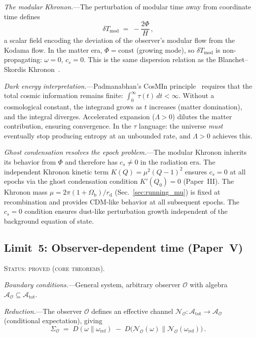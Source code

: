 \documentclass[prd,twocolumn,superscriptaddress,longbibliography,floatfix]{revtex4-2}
\newcommand{\chan}{\mathcal{N}}
\newcommand{\KL}{D}
\newcommand{\tauasym}{\tau}
\newcommand{\Aobs}{\mathcal{A}_{\mathcal{O}}}
\newcommand{\Atot}{\mathcal{A}_{\mathrm{tot}}}
\newcommand{\SigO}{\Sigma_{\mathcal{O}}}
\newcommand{\Tmod}{T_{\mathrm{mod}}}
\begin{document}
\emph{The modular Khronon.}---The perturbation of
modular time away from coordinate time defines
\begin{equation}
\delta\Tmod \;=\; -\frac{2\Phi}{H}\,,
\label{eq:modular_khronon}
\end{equation}
a scalar field encoding the deviation of the observer's
modular flow from the Kodama flow.  In the matter era,
$\Phi = \mathrm{const}$ (growing mode), so $\delta\Tmod$
is non-propagating: $\omega = 0$, $c_s = 0$.
This is the same dispersion relation as the
Blanchet--Skordis Khronon~\cite{BlanchetSkordis2024}.

\emph{Dark energy interpretation.}---Padmanabhan's CosMIn
principle~\cite{Padmanabhan2017} requires that the
total cosmic information remains finite:
$\int_0^\infty \tauasym(t)\,dt < \infty$.  Without a
cosmological constant, the integrand grows as $t$
increases (matter domination), and the integral diverges.
Accelerated expansion ($\Lambda > 0$) dilutes the matter
contribution, ensuring convergence.  In the
$\tauasym$ language: the universe \emph{must} eventually
stop producing entropy at an unbounded rate, and
$\Lambda > 0$ achieves this.

\emph{Ghost condensation resolves the epoch
problem.}---The modular Khronon inherits its behavior
from $\Phi$ and therefore has $c_s \neq 0$ in the
radiation era.  The independent Khronon kinetic term
$K(Q) = \mu^2(Q-1)^2$ ensures $c_s = 0$ at all epochs
via the ghost condensation condition $K'(Q_0) = 0$
(Paper~III).
The Khronon mass
$\mu = 2\pi(1+\Omega_{\mathrm{b}})/r_{\mathrm{d}}$
(Sec.~\ref{sec:running_mu}) is fixed at recombination
and provides CDM-like behavior at all subsequent
epochs.  The $c_s = 0$ condition ensures dust-like
perturbation growth independent of the background
equation of state.


\subsection{Limit~5: Observer-dependent time (Paper~V)}
\label{sec:limit_observer}

\textsc{Status: proved (core theorems).}

\emph{Boundary conditions.}---General system, arbitrary
observer $\mathcal{O}$ with algebra
$\Aobs \subseteq \Atot$.

\emph{Reduction.}---The observer $\mathcal{O}$ defines an
effective channel
$\chan_{\mathcal{O}}: \Atot \to \Aobs$
(conditional expectation), giving
\begin{equation}
\SigO \;=\; \KL(\omega\|\omega_{\mathrm{ref}})
\;-\; \KL\!\bigl(\chan_{\mathcal{O}}(\omega)\|
\chan_{\mathcal{O}}(\omega_{\mathrm{ref}})\bigr)\,.
\label{eq:sigma_O}
\end{equation}
\end{document}
